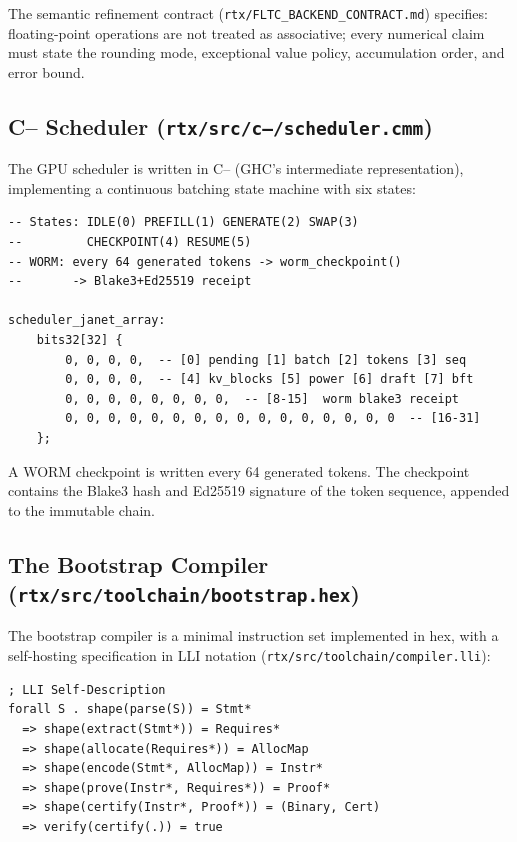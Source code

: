 \documentclass[11pt,a4paper]{article}
\begin{document}
The semantic refinement contract (\texttt{rtx/FLTC\_BACKEND\_CONTRACT.md})
specifies: floating-point operations are not treated as associative;
every numerical claim must state the rounding mode, exceptional value
policy, accumulation order, and error bound.

\subsection{C-- Scheduler (\texttt{rtx/src/c--/scheduler.cmm})}

The GPU scheduler is written in C-- (GHC's intermediate representation),
implementing a continuous batching state machine with six states:

\begin{lstlisting}[language={}]
-- States: IDLE(0) PREFILL(1) GENERATE(2) SWAP(3)
--         CHECKPOINT(4) RESUME(5)
-- WORM: every 64 generated tokens -> worm_checkpoint()
--       -> Blake3+Ed25519 receipt

scheduler_janet_array:
    bits32[32] {
        0, 0, 0, 0,  -- [0] pending [1] batch [2] tokens [3] seq
        0, 0, 0, 0,  -- [4] kv_blocks [5] power [6] draft [7] bft
        0, 0, 0, 0, 0, 0, 0, 0,  -- [8-15]  worm blake3 receipt
        0, 0, 0, 0, 0, 0, 0, 0, 0, 0, 0, 0, 0, 0, 0, 0  -- [16-31]
    };
\end{lstlisting}

A WORM checkpoint is written every 64 generated tokens. The checkpoint
contains the Blake3 hash and Ed25519 signature of the token sequence,
appended to the immutable chain.

\subsection{The Bootstrap Compiler (\texttt{rtx/src/toolchain/bootstrap.hex})}

The bootstrap compiler is a minimal instruction set implemented in hex,
with a self-hosting specification in LLI notation
(\texttt{rtx/src/toolchain/compiler.lli}):

\begin{lstlisting}[language={}]
; LLI Self-Description
forall S . shape(parse(S)) = Stmt*
  => shape(extract(Stmt*)) = Requires*
  => shape(allocate(Requires*)) = AllocMap
  => shape(encode(Stmt*, AllocMap)) = Instr*
  => shape(prove(Instr*, Requires*)) = Proof*
  => shape(certify(Instr*, Proof*)) = (Binary, Cert)
  => verify(certify(.)) = true
\end{lstlisting}
\end{document}
